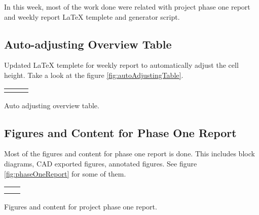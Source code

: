 \documentclass[../weekly]{subfiles}
\begin{document}

In this week, most of the work done were related with project phase one report and weekly
report \LaTeX{} templete and generator script.

\subsection{Auto-adjusting Overview Table}

Updated \LaTeX{} templete for weekly report to automatically adjust the cell height. Take
a look at the figure \ref{fig:autoAdjustingTable}.

\begin{center}
    \begin{tabular} {
            ccc
        }

        \includegraphics [
            width = 0.30\textwidth,
        ] {wr1.pdf}


        &
        \includegraphics [
            width = 0.30\textwidth,
        ] {wr3.pdf}

        &
        \includegraphics [
            width = 0.30\textwidth,
        ] {wr4.pdf}

        \\

    \end{tabular}
     {Auto adjusting overview table.}
    \label{fig:autoAdjustingTable}
\end{center}

\subsection{Figures and Content for Phase One Report}

Most of the figures and content for phase one report is done. This
includes block diagrams, CAD exported figures, annotated figures.
See figure \ref{fig:phaseOneReport} for some of them.

\begin{center}
    \begin{tabular} {
            cc
        }

        \includegraphics [
            width = 0.45\textwidth,
        ] {ss1.png}

        &
        \includegraphics [
            width = 0.45\textwidth,
        ] {ss2.png}

        \\
        \includegraphics [
            width = 0.45\textwidth,
        ] {ss3.png}

        &
        \includegraphics [
            width = 0.45\textwidth,
        ] {ss4.png}

        \\

    \end{tabular}
     {Figures and content for project phase one report.}
    \label{fig:phaseOneReport}
\end{center}
\end{document}
